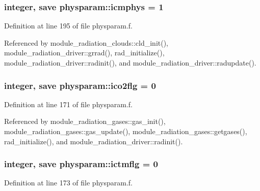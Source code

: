 \subsubsection[{\texorpdfstring{icmphys}{icmphys}}]{\setlength{\rightskip}{0pt plus 5cm}integer, save physparam\+::icmphys = 1}\hypertarget{namespacephysparam_af259ebea0c378b3b07343141977db03e}{}\label{namespacephysparam_af259ebea0c378b3b07343141977db03e}


Definition at line 195 of file physparam.\+f.



Referenced by module\+\_\+radiation\+\_\+clouds\+::cld\+\_\+init(), module\+\_\+radiation\+\_\+driver\+::grrad(), rad\+\_\+initialize(), module\+\_\+radiation\+\_\+driver\+::radinit(), and module\+\_\+radiation\+\_\+driver\+::radupdate().

\subsubsection[{\texorpdfstring{ico2flg}{ico2flg}}]{\setlength{\rightskip}{0pt plus 5cm}integer, save physparam\+::ico2flg = 0}\hypertarget{namespacephysparam_a61baf693e83ac6144d86fb8213d39a79}{}\label{namespacephysparam_a61baf693e83ac6144d86fb8213d39a79}


Definition at line 171 of file physparam.\+f.



Referenced by module\+\_\+radiation\+\_\+gases\+::gas\+\_\+init(), module\+\_\+radiation\+\_\+gases\+::gas\+\_\+update(), module\+\_\+radiation\+\_\+gases\+::getgases(), rad\+\_\+initialize(), and module\+\_\+radiation\+\_\+driver\+::radinit().

\subsubsection[{\texorpdfstring{ictmflg}{ictmflg}}]{\setlength{\rightskip}{0pt plus 5cm}integer, save physparam\+::ictmflg = 0}\hypertarget{namespacephysparam_a4eef5ac5e5b83526d5da7de493cfe73d}{}\label{namespacephysparam_a4eef5ac5e5b83526d5da7de493cfe73d}


Definition at line 173 of file physparam.\+f.



